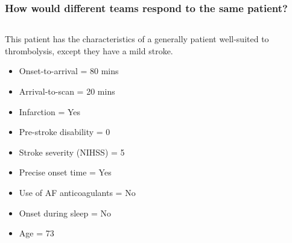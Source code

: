 \documentclass{beamer}
\begin{document}

\begin{frame}
\frametitle{How would different teams respond to the same patient?}

\begin{columns}%

    \begin{column}{0.45\textwidth}

        \begin{footnotesize}
    
        This patient has the characteristics of a generally patient well-suited to thrombolysis, except they have a mild stroke.

        \vspace{3mm}
        

        \begin{itemize}
            \item Onset-to-arrival = 80 mins
            \item Arrival-to-scan = 20 mins
            \item Infarction = Yes
            \item Pre-stroke disability = 0
            \item Stroke severity (NIHSS) = 5
            \item Precise onset time = Yes
            \item Use of AF anticoagulants = No
            \item Onset during sleep = No
            \item Age = 73
        \end{itemize}
        \end{footnotesize}
        
    \end{column}
    

\end{columns}
\end{frame}
\end{document}
